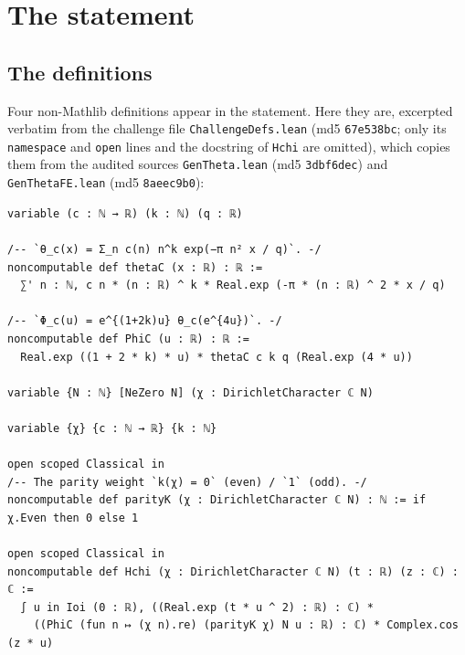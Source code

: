 \documentclass[11pt]{article}
\theoremstyle{definition}
\newcommand{\lean}[1]{\texttt{#1}}
\begin{document}
\section{The statement}\label{sec:statement}

\subsection{The definitions}

Four non-Mathlib definitions appear in the statement. Here they are, excerpted verbatim from the challenge file \lean{ChallengeDefs.lean} (md5 \lean{67e538bc}; only its \lean{namespace} and \lean{open} lines and the docstring of \lean{Hchi} are omitted), which copies them from the audited sources \lean{GenTheta.lean} (md5 \lean{3dbf6dec}) and \lean{GenThetaFE.lean} (md5 \lean{8aeec9b0}):

\begin{lstlisting}
variable (c : ℕ → ℝ) (k : ℕ) (q : ℝ)

/-- `θ_c(x) = Σ_n c(n) n^k exp(−π n² x / q)`. -/
noncomputable def thetaC (x : ℝ) : ℝ :=
  ∑' n : ℕ, c n * (n : ℝ) ^ k * Real.exp (-π * (n : ℝ) ^ 2 * x / q)

/-- `Φ_c(u) = e^{(1+2k)u} θ_c(e^{4u})`. -/
noncomputable def PhiC (u : ℝ) : ℝ :=
  Real.exp ((1 + 2 * k) * u) * thetaC c k q (Real.exp (4 * u))

variable {N : ℕ} [NeZero N] (χ : DirichletCharacter ℂ N)

variable {χ} {c : ℕ → ℝ} {k : ℕ}

open scoped Classical in
/-- The parity weight `k(χ) = 0` (even) / `1` (odd). -/
noncomputable def parityK (χ : DirichletCharacter ℂ N) : ℕ := if χ.Even then 0 else 1

open scoped Classical in
noncomputable def Hchi (χ : DirichletCharacter ℂ N) (t : ℝ) (z : ℂ) : ℂ :=
  ∫ u in Ioi (0 : ℝ), ((Real.exp (t * u ^ 2) : ℝ) : ℂ) *
    ((PhiC (fun n ↦ (χ n).re) (parityK χ) N u : ℝ) : ℂ) * Complex.cos (z * u)
\end{lstlisting}
\end{document}
